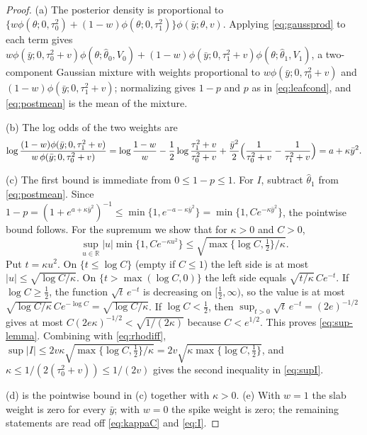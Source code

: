 \begin{proof}
(a) The posterior density is proportional to $\{w\phi(\theta;0,\tau_0^2)+(1-w)\phi(\theta;0,\tau_1^2)\}\phi(\bar y;\theta,v)$. Applying \eqref{eq:gaussprod} to each term gives $w\phi(\bar y;0,\tau_0^2+v)\phi(\theta;\hat\theta_0,V_0)+(1-w)\phi(\bar y;0,\tau_1^2+v)\phi(\theta;\hat\theta_1,V_1)$, a two-component Gaussian mixture with weights proportional to $w\phi(\bar y;0,\tau_0^2+v)$ and $(1-w)\phi(\bar y;0,\tau_1^2+v)$; normalizing gives $1-p$ and $p$ as in \eqref{eq:leafcond}, and \eqref{eq:postmean} is the mean of the mixture.

(b) The log odds of the two weights are
\[
\log\frac{(1-w)\phi(\bar y;0,\tau_1^2+v)}{w\,\phi(\bar y;0,\tau_0^2+v)}
=\log\frac{1-w}{w}-\frac12\log\frac{\tau_1^2+v}{\tau_0^2+v}+\frac{\bar y^2}{2}\Bigl(\frac{1}{\tau_0^2+v}-\frac{1}{\tau_1^2+v}\Bigr)=a+\kappa\bar y^2 .
\]

(c) The first bound is immediate from $0\le1-p\le1$. For $I$, subtract $\hat\theta_1$ from \eqref{eq:postmean}. Since $1-p=(1+e^{a+\kappa\bar y^2})^{-1}\le\min\{1,e^{-a-\kappa\bar y^2}\}=\min\{1,Ce^{-\kappa\bar y^2}\}$, the pointwise bound follows. For the supremum we show that for $\kappa>0$ and $C>0$,
\begin{equation}
\sup_{u\in\mathbb R}|u|\min\{1,Ce^{-\kappa u^2}\}\le\sqrt{\max\{\log C,\tfrac12\}/\kappa}.
\label{eq:sup-lemma}
\end{equation}
Put $t=\kappa u^2$. On $\{t\le\log C\}$ (empty if $C\le1$) the left side is at most $|u|\le\sqrt{\log C/\kappa}$. On $\{t>\max(\log C,0)\}$ the left side equals $\sqrt{t/\kappa}\,Ce^{-t}$. If $\log C\ge\tfrac12$, the function $\sqrt t\,e^{-t}$ is decreasing on $[\tfrac12,\infty)$, so the value is at most $\sqrt{\log C/\kappa}\,Ce^{-\log C}=\sqrt{\log C/\kappa}$. If $\log C<\tfrac12$, then $\sup_{t>0}\sqrt t\,e^{-t}=(2e)^{-1/2}$ gives at most $C(2e\kappa)^{-1/2}<\sqrt{1/(2\kappa)}$ because $C<e^{1/2}$. This proves \eqref{eq:sup-lemma}. Combining with \eqref{eq:rhodiff}, $\sup|I|\le2v\kappa\sqrt{\max\{\log C,\tfrac12\}/\kappa}=2v\sqrt{\kappa\max\{\log C,\tfrac12\}}$, and $\kappa\le1/(2(\tau_0^2+v))\le1/(2v)$ gives the second inequality in \eqref{eq:supI}.

(d) is the pointwise bound in (c) together with $\kappa>0$. (e) With $w=1$ the slab weight is zero for every $\bar y$; with $w=0$ the spike weight is zero; the remaining statements are read off \eqref{eq:kappaC} and \eqref{eq:I}.
\end{proof}

